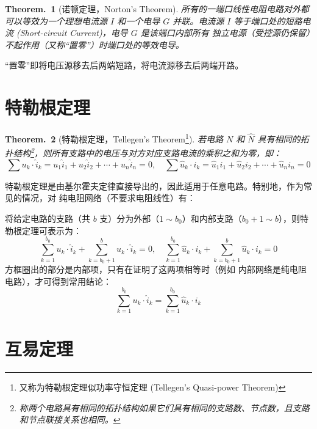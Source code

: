 \documentclass[UTF8]{report}
\theoremstyle{MyLineTheoremStyle} %
\newtheorem{LineTheorem}{Theorem.\,}
\theoremstyle{MyBlockTheoremStyle} %
\newtheorem{BlockTheorem}[LineTheorem]{Theorem.\,} %
\theoremstyle{MySubsubsectionStyle} %
\begin{document}
\begin{LineTheorem}[诺顿定理，Norton's Theorem]\label{诺顿定理}
    所有的一端口线性电阻电路对外都可以等效为一个理想电流源 $I$ 和一个电导 $G$ 并联。电流源 $I$ 等于端口处的短路电流 (Short-circuit Current)，电导 $G$ 是该端口内部所有{\color{red} 独立电源}（受控源仍保留）不起作用（又称“置零”）时端口处的等效电导。
\end{LineTheorem}

“置零”即将电压源移去后两端短路，将电流源移去后两端开路。

\section{特勒根定理}


\begin{BlockTheorem}[特勒根定理，Tellegen's Theorem\footnote{又称为特勒根定理似功率守恒定理 (Tellegen's Quasi-power Theorem)}]\label{特勒根定理}
    若电路 $N$ 和 $\hat{N}$ 具有相同的拓扑结构\footnote{称两个电路具有相同的拓扑结构如果它们具有相同的支路数、节点数，且支路和节点联接关系也相同。}，则所有支路中的电压与对方对应支路电流的乘积之和为零，即：
    \begin{equation}
    \sum u_k \cdot \hat{i}_k = u_1\hat{i}_1 + u_2\hat{i}_2 + \cdots + u_n\hat{i}_n = 0,\quad 
    \sum \hat{u}_k \cdot i_k = \hat{u}_1 i_1 + \hat{u}_2 i_2 + \cdots + \hat{u}_n i_n = 0
    \end{equation}
\end{BlockTheorem}
特勒根定理是由基尔霍夫定律直接导出的，因此适用于任意电路。特别地，作为常见的情况，对{\color{red} 纯电阻网络}（不要求电阻线性）有：

将给定电路的支路（共 $b$ 支）分为外部（$1 \sim b_0$）和内部支路（$b_0 + 1 \sim b$），则特勒根定理可表示为：
\begin{equation}
\sum_{k=1}^{b_0} u_k \cdot \hat{i}_k + \boxed{\sum_{k=b_0+1}^{b} u_k \cdot \hat{i}_k} = 0
,\quad 
\sum_{k=1}^{b_0} \hat{u}_k \cdot i_k + \boxed{\sum_{k=b_0+1}^{b} \hat{u}_k \cdot i_k} = 0
\end{equation}
方框圈出的部分是内部项，只有在证明了这两项相等时（例如 {\color{red} 内部网络是纯电阻电路}），才可得到常用结论：
\begin{equation}
\sum_{k=1}^{b_0} u_k \cdot \hat{i}_k = \sum_{k=1}^{b_0} \hat{u}_k \cdot i_k
\end{equation}


\section{互易定理}
\end{document}
